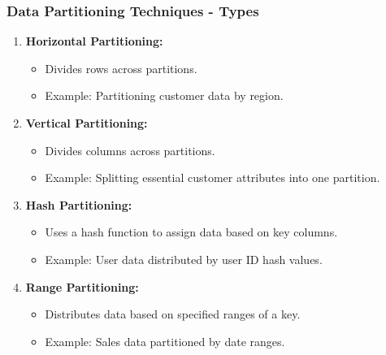 \documentclass{beamer}
\begin{document}
\begin{frame}[fragile]
    \frametitle{Data Partitioning Techniques - Types}
    \begin{enumerate}
        \item \textbf{Horizontal Partitioning:}
            \begin{itemize}
                \item Divides rows across partitions.
                \item Example: Partitioning customer data by region.
            \end{itemize}

        \item \textbf{Vertical Partitioning:}
            \begin{itemize}
                \item Divides columns across partitions.
                \item Example: Splitting essential customer attributes into one partition.
            \end{itemize}
        
        \item \textbf{Hash Partitioning:}
            \begin{itemize}
                \item Uses a hash function to assign data based on key columns.
                \item Example: User data distributed by user ID hash values.
            \end{itemize}

        \item \textbf{Range Partitioning:}
            \begin{itemize}
                \item Distributes data based on specified ranges of a key.
                \item Example: Sales data partitioned by date ranges.
            \end{itemize}
    \end{enumerate}
\end{frame}
\end{document}
